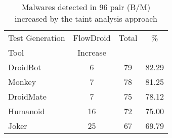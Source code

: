 \begin{table}[ht]
\centering
\begin{tabular}{lccc}\toprule
 Test Generation & FlowDroid & Total & \%\\
 Tool & Increase  &  & \\ \midrule
 DroidBot & 6 & 79 & 82.29\\
 Monkey & 7 &  78 & 81.25 \\
 DroidMate & 7 & 75 & 78.12  \\
 Humanoid & 16 & 72 & 75.00 \\
 Joker & 25 & 67 & 69.79  \\\midrule
 
\end{tabular} 
\caption{Malwares detected in 96 pair (B/M) increased by the taint analysis approach}
\label{tab:taint}
\end{table}





